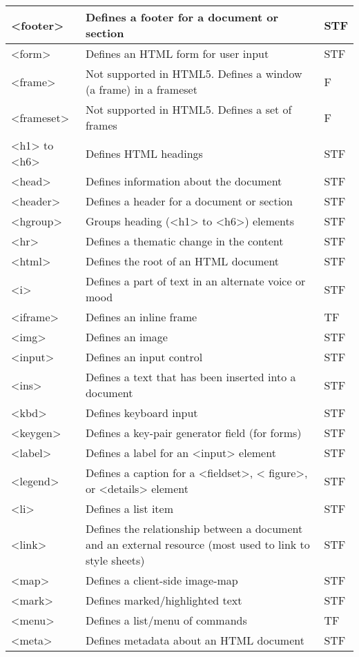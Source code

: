 \begin{longtable}{|p{60pt}|p{320pt}|p{40pt}|}
\hline
<footer>		&	Defines a footer for a document or section & STF\\
\hline
<form>		&	Defines an HTML form for user input & STF\\
\hline
<frame>		&	Not supported in HTML5. Defines a window (a frame) in a frameset & F \\
\hline
<frameset>	&	Not supported in HTML5. Defines a set of frames & F\\
\hline
<h1> to <h6>	&	Defines HTML headings & STF\\
\hline
<head>		&	Defines information about the document & STF\\
\hline
<header>		&	Defines a header for a document or section & STF\\
\hline
<hgroup>		&	Groups heading (<h1> to <h6>) elements & STF\\
\hline
<hr>			&	Defines a thematic change in the content & STF\\
\hline
<html>		&	Defines the root of an HTML document & STF\\
\hline
<i>			&	Defines a part of text in an alternate voice or mood & STF\\
\hline
<iframe>		&	Defines an inline frame & TF\\
\hline
<img>		&	Defines an image & STF\\
\hline
<input>		&	Defines an input control & STF\\
\hline
<ins>		&	Defines a text that has been inserted into a document & STF\\
\hline
<kbd>		&	Defines keyboard input & STF\\
\hline
<keygen>		&	Defines a key-pair generator field (for forms) & STF\\
\hline
<label>		&	Defines a label for an <input> element & STF\\
\hline
<legend>		&	Defines a caption for a <fieldset>, < figure>, or <details> element & STF\\
\hline
<li>			&	Defines a list item & STF\\
\hline
<link>		&	Defines the relationship between a document and an external resource (most used to link to style sheets)	 & STF\\
\hline
<map>		&	Defines a client-side image-map & STF\\
\hline
<mark>		&	Defines marked/highlighted text & STF\\
\hline
<menu>		&	Defines a list/menu of commands &TF\\
\hline
<meta>		&	Defines metadata about an HTML document & STF\\

\end{longtable}
